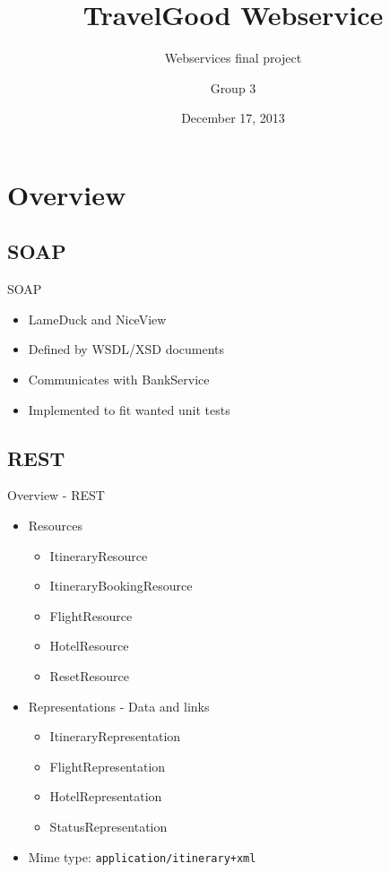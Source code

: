 
\title{TravelGood Webservice}
\subtitle{Webservices final project}
\author{Group 3}
\date{December 17, 2013}

\begin{frame}
	\maketitle
\end{frame}


\section{Overview}

\subsection{SOAP}
\begin{frame}{SOAP}
\begin{itemize}[<+->]
\item LameDuck and NiceView
\item Defined by WSDL/XSD documents
\item Communicates with BankService
\item Implemented to fit wanted unit tests
\end{itemize}
\end{frame}


\subsection{REST}
\begin{frame}{Overview - REST}
\begin{itemize}[<+->]
	
	\item Resources
	\begin{itemize}[<2->]
		\item ItineraryResource
		\item ItineraryBookingResource
		\item FlightResource
		\item HotelResource
		\item ResetResource
	\end{itemize}
		
	\medskip\item <3-> Representations - Data and links
	\begin{itemize}[<4->]
		\item ItineraryRepresentation
		\item FlightRepresentation
		\item HotelRepresentation
		\item StatusRepresentation
	\end{itemize}
	
	\item <5-> Mime type: \texttt{application/itinerary+xml}

\end{itemize}
\end{frame}

